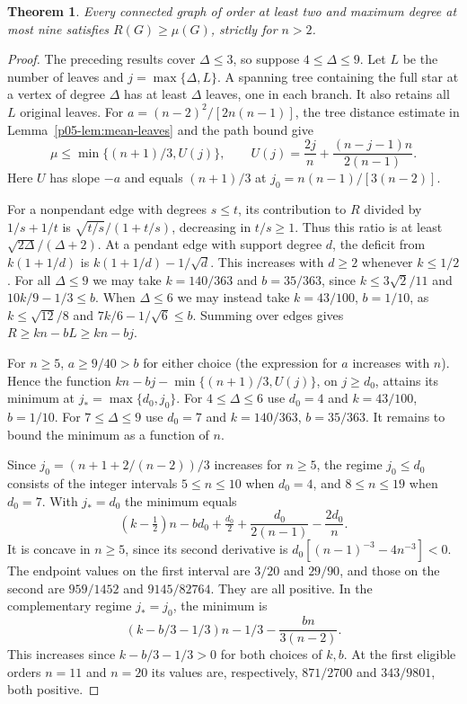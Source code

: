\documentclass[11pt,a4paper]{article}
\newtheorem{theorem}{Theorem}[section]
\begin{document}
\begin{theorem}\label{p05-thm:mean-nine}
Every connected graph of order at least two and maximum degree at most nine satisfies
$R(G)\ge\mu(G)$, strictly for $n>2$.
\end{theorem}
\begin{proof}
The preceding results cover $\Delta\le3$, so suppose $4\le\Delta\le9$.
Let $L$ be the number of leaves and $j=\max\{\Delta,L\}$.
A spanning tree containing the full star at a vertex of degree
$\Delta$ has at least $\Delta$ leaves, one in each branch. It also
retains all $L$ original leaves.
For $a=(n-2)^2/[2n(n-1)]$, the tree distance estimate in
Lemma~\ref{p05-lem:mean-leaves} and the path bound give
\[
 \mu\le\min\{(n+1)/3, U(j)\},\qquad
 U(j)=\frac{2j}{n}+\frac{(n-j-1)n}{2(n-1)}.
\]
Here $U$ has slope $-a$ and equals $(n+1)/3$ at
$j_0=n(n-1)/[3(n-2)]$.

For a nonpendant edge with degrees $s\le t$, its contribution to $R$
divided by $1/s+1/t$ is $\sqrt{t/s}/(1+t/s)$, decreasing in $t/s\ge1$.
Thus this ratio is at least $\sqrt{2\Delta}/(\Delta+2)$.
At a pendant edge with support degree $d$, the deficit from
$k(1+1/d)$ is $k(1+1/d)-1/\sqrt d$. This increases with $d\ge2$
whenever $k\le1/2$. For all $\Delta\le9$ we may take
$k=140/363$ and $b=35/363$, since
$k\le3\sqrt2/11$ and $10k/9-1/3\le b$. When $\Delta\le6$ we may
instead take $k=43/100$, $b=1/10$, as
$k\le\sqrt{12}/8$ and $7k/6-1/\sqrt6\le b$.
Summing over edges gives $R\ge kn-bL\ge kn-bj$.

For $n\ge5$, $a\ge9/40>b$ for either choice (the expression for $a$
increases with $n$). Hence the function
$kn-bj-\min\{(n+1)/3,U(j)\}$, on $j\ge d_0$, attains its minimum at
$j_* = \max\{d_0,j_0\}$. For $4\le\Delta\le6$ use $d_0=4$ and $k=43/100$, $b=1/10$.
For $7\le\Delta\le9$ use $d_0=7$ and $k=140/363$, $b=35/363$.
It remains to bound the minimum as a function of $n$.

Since $j_0=(n+1+2/(n-2))/3$ increases for $n\ge5$, the regime
$j_0\le d_0$ consists of the integer intervals $5\le n\le10$ when
$d_0=4$, and $8\le n\le19$ when $d_0=7$. With $j_*=d_0$ the minimum
equals
\[
 (k-\tfrac12)n-bd_0+\tfrac{d_0}{2}
   +\frac{d_0}{2(n-1)}-\frac{2d_0}n.
\]
It is concave in $n\ge5$, since its second derivative is
$d_0[(n-1)^{-3}-4n^{-3}]<0$. The endpoint values on the first
interval are $3/20$ and $29/90$, and those on the second are
$959/1452$ and $9145/82764$. They are all positive.
In the complementary regime $j_*=j_0$, the minimum is
\[
 (k-b/3-1/3)n-1/3-\frac{bn}{3(n-2)}.
\]
This increases since $k-b/3-1/3>0$ for both choices of $k,b$.
At the first eligible orders $n=11$ and $n=20$ its values are,
respectively, $871/2700$ and $343/9801$, both positive.
\end{proof}
\end{document}
